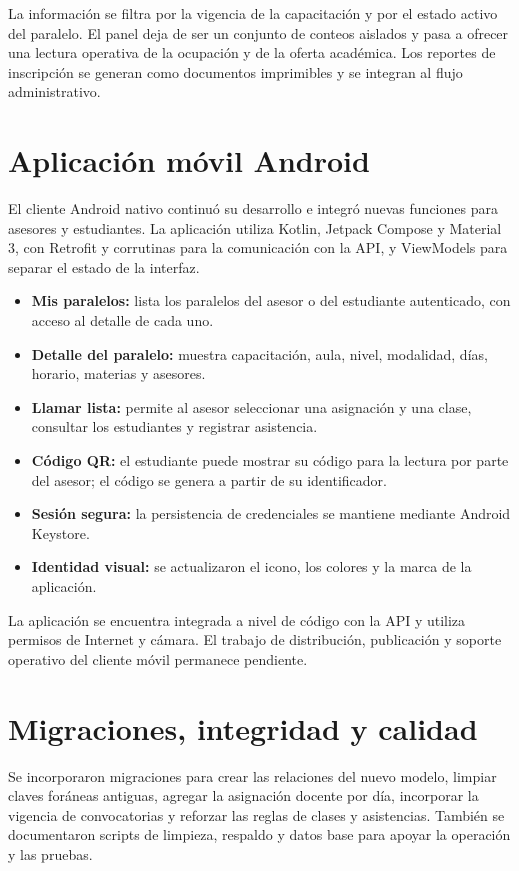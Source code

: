\documentclass[12pt,a4paper,oneside]{report}
\begin{document}
La información se filtra por la vigencia de la capacitación y por el estado activo del paralelo. El panel deja de ser un conjunto de conteos aislados y pasa a ofrecer una lectura operativa de la ocupación y de la oferta académica. Los reportes de inscripción se generan como documentos imprimibles y se integran al flujo administrativo.

\section{Aplicación móvil Android}

El cliente Android nativo continuó su desarrollo e integró nuevas funciones para asesores y estudiantes. La aplicación utiliza Kotlin, Jetpack Compose y Material 3, con Retrofit y corrutinas para la comunicación con la API, y ViewModels para separar el estado de la interfaz.

\begin{itemize}[leftmargin=1.5em]
  \item \textbf{Mis paralelos:} lista los paralelos del asesor o del estudiante autenticado, con acceso al detalle de cada uno.
  \item \textbf{Detalle del paralelo:} muestra capacitación, aula, nivel, modalidad, días, horario, materias y asesores.
  \item \textbf{Llamar lista:} permite al asesor seleccionar una asignación y una clase, consultar los estudiantes y registrar asistencia.
  \item \textbf{Código QR:} el estudiante puede mostrar su código para la lectura por parte del asesor; el código se genera a partir de su identificador.
  \item \textbf{Sesión segura:} la persistencia de credenciales se mantiene mediante Android Keystore.
  \item \textbf{Identidad visual:} se actualizaron el icono, los colores y la marca de la aplicación.
\end{itemize}

La aplicación se encuentra integrada a nivel de código con la API y utiliza permisos de Internet y cámara. El trabajo de distribución, publicación y soporte operativo del cliente móvil permanece pendiente.

\section{Migraciones, integridad y calidad}

Se incorporaron migraciones para crear las relaciones del nuevo modelo, limpiar claves foráneas antiguas, agregar la asignación docente por día, incorporar la vigencia de convocatorias y reforzar las reglas de clases y asistencias. También se documentaron scripts de limpieza, respaldo y datos base para apoyar la operación y las pruebas.
\end{document}
